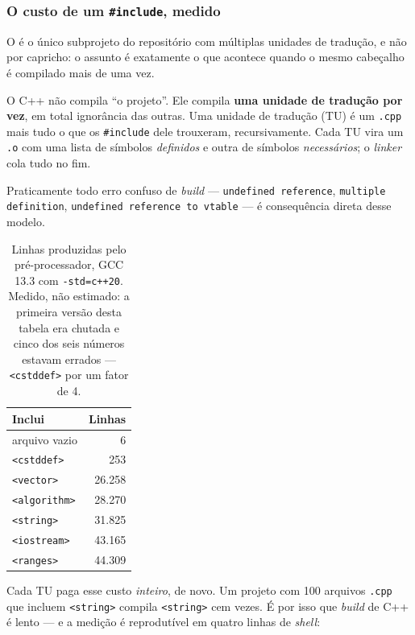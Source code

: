 \subsubsection{O custo de um \texttt{\#include}, medido}

O  é o único subprojeto do repositório com múltiplas unidades
de tradução, e não por capricho: o assunto é exatamente o que acontece quando o
mesmo cabeçalho é compilado mais de uma vez.

\begin{porque}
O C++ não compila ``o projeto''. Ele compila \textbf{uma unidade de tradução
por vez}, em total ignorância das outras. Uma unidade de tradução (TU) é um
\texttt{.cpp} mais tudo o que os \texttt{\#include} dele trouxeram,
recursivamente. Cada TU vira um \texttt{.o} com uma lista de símbolos
\emph{definidos} e outra de símbolos \emph{necessários}; o \emph{linker} cola
tudo no fim.

Praticamente todo erro confuso de \emph{build} --- \texttt{undefined
reference}, \texttt{multiple definition}, \texttt{undefined reference to
vtable} --- é consequência direta desse modelo.
\end{porque}

\begin{table}[htbp]
\centering
\caption{Linhas produzidas pelo pré-processador, GCC 13.3 com
         \texttt{-std=c++20}. Medido, não estimado: a primeira versão desta
         tabela era chutada e cinco dos seis números estavam errados ---
         \texttt{<cstddef>} por um fator de 4.}
\label{tab:include-custo}
\footnotesize
\begin{tabular}{@{}lr@{}}
\toprule
\textbf{Inclui} & \textbf{Linhas} \\
\midrule
arquivo vazio        & 6 \\
\texttt{<cstddef>}   & 253 \\
\texttt{<vector>}    & 26.258 \\
\texttt{<algorithm>} & 28.270 \\
\texttt{<string>}    & 31.825 \\
\texttt{<iostream>}  & 43.165 \\
\texttt{<ranges>}    & 44.309 \\
\bottomrule
\end{tabular}
\end{table}

Cada TU paga esse custo \emph{inteiro}, de novo. Um projeto com 100 arquivos
\texttt{.cpp} que incluem \texttt{<string>} compila \texttt{<string>} cem vezes.
É por isso que \emph{build} de C++ é lento --- e a medição é reprodutível em
quatro linhas de \emph{shell}:

